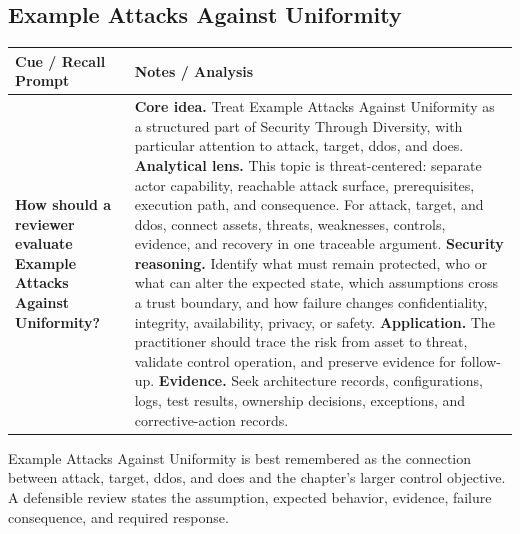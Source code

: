 \documentclass[11pt]{article}
\newcommand{\CornellHeader}{%
\rowcolor{Navy}\color{white}\bfseries Cue / Recall Prompt & \color{white}\bfseries Notes / Analysis\\\hline}
\newcommand{\CornellRow}[2]{%
\cellcolor{CueGray}\RaggedRight\textbf{#1} & \RaggedRight #2\\\hline}
\begin{document}
\subsection*{Example Attacks Against Uniformity}
\begin{longtable}{>{\RaggedRight\arraybackslash}p{}|>{\RaggedRight\arraybackslash}p{}}
\CornellHeader
\CornellRow{How should a reviewer evaluate Example Attacks Against Uniformity?}{\textbf{Core idea.} Treat Example Attacks Against Uniformity as a structured part of Security Through Diversity, with particular attention to attack, target, ddos, and does. \textbf{Analytical lens.} This topic is threat-centered: separate actor capability, reachable attack surface, prerequisites, execution path, and consequence. For attack, target, and ddos, connect assets, threats, weaknesses, controls, evidence, and recovery in one traceable argument. \textbf{Security reasoning.} Identify what must remain protected, who or what can alter the expected state, which assumptions cross a trust boundary, and how failure changes confidentiality, integrity, availability, privacy, or safety. \textbf{Application.} The practitioner should trace the risk from asset to threat, validate control operation, and preserve evidence for follow-up. \textbf{Evidence.} Seek architecture records, configurations, logs, test results, ownership decisions, exceptions, and corrective-action records.}
\end{longtable}
\begin{topicsummary}
Example Attacks Against Uniformity is best remembered as the connection between attack, target, ddos, and does and the chapter's larger control objective. A defensible review states the assumption, expected behavior, evidence, failure consequence, and required response.
\end{topicsummary}
\end{document}

